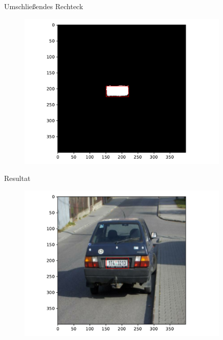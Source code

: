 \begin{frame}{Umschlie{\ss}endes Rechteck}
    \begin{figure}
        \centering
        \includegraphics[width=0.9\textwidth]{img/model_demo_5}
    \end{figure}
\end{frame}

\begin{frame}{Resultat}
    \begin{figure}
        \centering
        \includegraphics[width=0.9\textwidth]{img/model_demo_6}
    \end{figure}
\end{frame}
